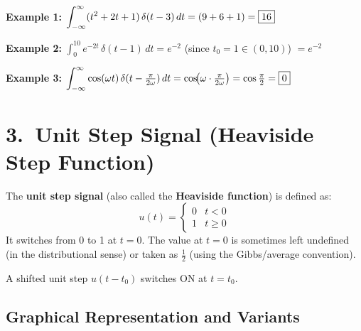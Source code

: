 \documentclass[10pt,a4paper]{article}
\newcommand{\Int}{\displaystyle\int_{-\infty}^{\infty}}
\begin{document}
\begin{exbox}
\textbf{Example 1:} $\displaystyle\Int (t^2+2t+1)\,\delta(t-3)\,dt = (9+6+1) = \boxed{16}$

\textbf{Example 2:} $\displaystyle\int_0^{10} e^{-2t}\,\delta(t-1)\,dt = e^{-2}$ \quad (since $t_0=1\in(0,10)$) $=\boxed{e^{-2}}$

\textbf{Example 3:} $\displaystyle\Int \cos(\omega t)\,\delta(t-\tfrac{\pi}{2\omega})\,dt = \cos\!\bigl(\omega\cdot\tfrac{\pi}{2\omega}\bigr)=\cos\tfrac{\pi}{2}=\boxed{0}$
\end{exbox}

\section{3.\ Unit Step Signal (Heaviside Step Function)}

\begin{defbox}
The \textbf{unit step signal} (also called the \textbf{Heaviside function}) is defined as:
\[
  u(t) = \begin{cases} 0 & t < 0 \\ 1 & t \geq 0 \end{cases}
\]
It switches from 0 to 1 at $t=0$. The value at $t=0$ is sometimes left undefined (in the distributional sense) or taken as $\tfrac{1}{2}$ (using the Gibbs/average convention).

A shifted unit step $u(t-t_0)$ switches ON at $t=t_0$.
\end{defbox}

\subsection*{Graphical Representation and Variants}
\end{document}
